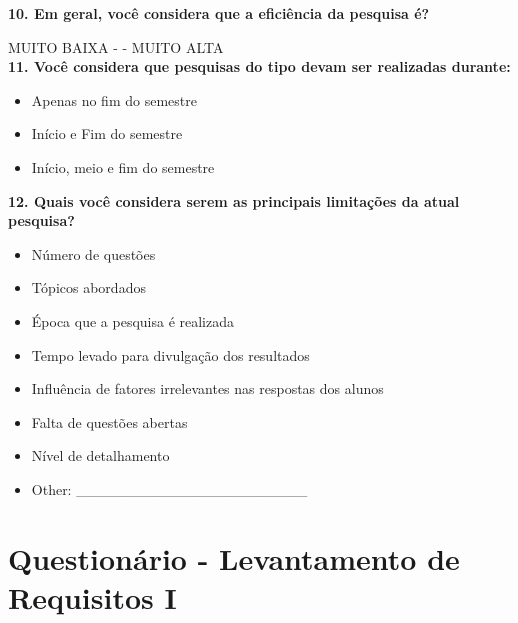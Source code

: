 \documentclass[
  12pt,       %
  openright,      %
  oneside,      %
  a4paper,      %
  english,      %
  french,        %
  spanish,     %
  brazil        %
  ]{abntex2-decsi}
\begin{document}
\begin{apendicesenv}
        \textbf{10. Em geral, você considera que a eficiência da pesquisa é?}
        
        MUITO BAIXA -      - MUITO ALTA\\
        
        \textbf{11. Você considera que pesquisas do tipo devam ser realizadas durante:}
        	
            \begin{itemize}[label=\Circle]
            
            \item Apenas no fim do semestre
            \item Início e Fim do semestre
            \item Início, meio e fim do semestre
            
            \end{itemize}
        
        \textbf{12. Quais você considera serem as principais limitações da atual pesquisa?}
        	
            \begin{multicols}{2}
            \begin{itemize}[label=\Square]       
            \item Número de questões          
            \item Tópicos abordados         
            \item Época que a pesquisa é realizada           
            \item Tempo levado para divulgação dos resultados           
            \item Influência de fatores irrelevantes nas respostas dos alunos            
            \item Falta de questões abertas            
            \item Nível de detalhamento
            \item Other: \_\_\_\_\_\_\_\_\_\_\_\_\_\_\_\_\_\_\_\_\_\_           
            \end{itemize}
            \end{multicols}

\chapter{Questionário - Levantamento de Requisitos I}\label{questionario_2}


\end{apendicesenv}
\end{document}
